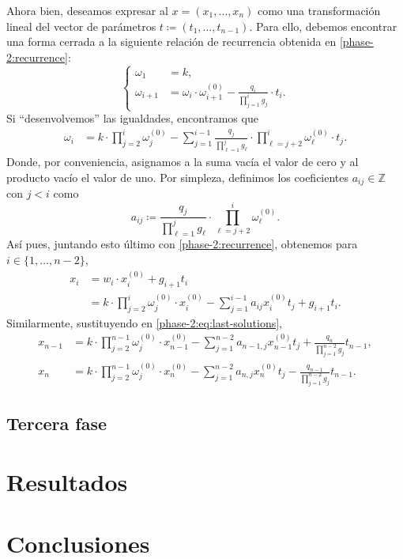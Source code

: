 \documentclass[11pt]{article}
\begin{document}
Ahora bien, deseamos expresar al $x = (x_1, \ldots, x_n)$ como una transformación lineal del vector
de parámetros $t \coloneq (t_1, \ldots, t_{n-1})$. Para ello, debemos encontrar una forma cerrada a
la siguiente relación de recurrencia obtenida en \ref{phase-2:recurrence}:
\begin{equation*}
	\begin{cases}
		\omega_1 &= k, \\
		\omega_{i + 1} &= \omega_i \cdot \omega_{i + 1}^{(0)} - \frac{q_i}{\prod_{j=1}^{i}g_j} \cdot t_i.
	\end{cases}
\end{equation*}
Si ``desenvolvemos'' las igualdades, encontramos que
\begin{align}
	\omega_i &= k \cdot \prod_{j=2}^{i} \omega_j^{(0)} -
			 \sum_{j=1}^{i - 1}\frac{q_j}{\prod_{\ell=1}^{j}g_\ell} \cdot
			 \prod_{\ell=j+2}^{i}\omega_\ell^{(0)} \cdot t_j.
\end{align}
Donde, por conveniencia, asignamos a la suma vacía el valor de cero y al producto vacío el valor de
uno. Por simpleza, definimos los coeficientes $a_{ij} \in \mathbb{Z}$ con $j < i$ como
\begin{equation}
	\label{phase-2:eq:coeffs}
	a_{ij} \coloneq \frac{q_j}{\prod_{\ell = 1}^{j}g_\ell} \cdot \prod_{\ell = j +
	2}^{i}\omega_\ell^{(0)}.
\end{equation}
Así pues, juntando esto último con \ref{phase-2:recurrence}, obtenemos para $i \in \{1, \ldots, n -
2\}$, 
\begin{align}
	x_i &= w_i \cdot x_i^{(0)} + g_{i + 1}t_i \nonumber \\
		&= k \cdot \prod_{j=2}^{i}\omega_j^{(0)} \cdot x_i^{(0)} - \sum_{j=1}^{i - 1}a_{ij}x_i^{(0)}
		t_j + g_{i + 1}t_i.
\end{align}
Similarmente, sustituyendo en \ref{phase-2:eq:last-solutions},
\begin{align*}
	x_{n-1} &= k \cdot \prod_{j=2}^{n-1} \omega_j^{(0)} \cdot x_{n-1}^{(0)} - \sum_{j=1}^{n-2}
	a_{n-1,j}x_{n-1}^{(0)} t_j + \frac{q_n}{\prod_{j=1}^{n-2}g_j} t_{n-1}, \\
	x_{n} &= k \cdot \prod_{j=2}^{n-1} \omega_j^{(0)} \cdot x_{n}^{(0)} - \sum_{j=1}^{n-2}a_{n,j}x_n^{(0)}t_j -
	\frac{q_{n-1}}{\prod_{j=1}^{n-2} g_j}t_{n-1}.
\end{align*}

\subsection*{Tercera fase}

\section*{Resultados}
\section*{Conclusiones}



\end{document}
